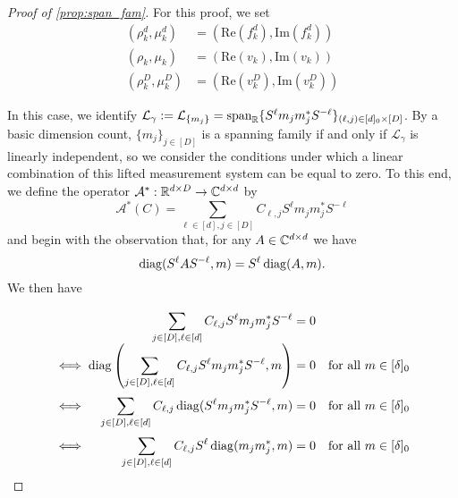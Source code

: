 \begin{proof}[Proof of \cref{prop:span_fam}]
  For this proof, we set \begin{align*} (\rho_k^d, \mu_k^d) &= (\mathrm{Re}(f_k^d), \mathrm{Im}(f_k^d)) \\ (\rho_k, \mu_k) &= (\mathrm{Re}(v_k), \mathrm{Im}(v_k)) \\ (\rho_k^D, \mu_k^D) &= (\mathrm{Re}(v_k^D), \mathrm{Im}(v_k^D)) \end{align*}
  
  In this case, we identify $\mathcal{L}_\gamma := \mathcal{L}_{\{m_j\}} = \operatorname{span}_{\mathbb{R}}\{S^{\ell} m_j m_j^* S^{-\ell}\}_{(\ell, j) \in [d]_0 \times [D]}$.  By a basic dimension count, $\{m_j\}_{j \in [D]}$ is a spanning family if and only if $\mathcal{L}_\gamma$ is linearly independent, so we consider the conditions under which a linear combination of this lifted measurement system can be equal to zero.  To this end, we define the operator $\mathcal{A}^* : \mathbb{R}^{d \times D} \to \mathbb{C}^{d \times d}$ by \begin{equation} \mathcal{A}^*(C) = \sum_{\ell \in [d], j \in [D]} C_{\ell, j} S^\ell m_j m_j^* S^{-\ell} \label{eq:synth_op} \end{equation} and begin with the observation that, for any $A \in \mathbb{C}^{d \times d}$ we have \[\operatorname{diag}(S^\ell A S^{-\ell}, m) = S^\ell \operatorname{diag}(A, m).\]  We then have
  \[\arraycolsep=1.4pt\def\arraystretch{2}
  \begin{array}{c>{\displaystyle}rcl@{\quad}r}
    & \sum_{j \in [D], \ell \in [d]} C_{\ell, j} S^\ell m_j m_j^* S^{-\ell} & = & 0 & \\
    \iff & \diag\left(\sum_{j \in [D], \ell \in [d]} C_{\ell, j} S^\ell m_j m_j^* S^{-\ell}, m\right) & = & 0 & \text{for all} \ m \in [\delta]_0 \\
    \iff & \sum_{j \in [D], \ell \in [d]} C_{\ell, j} \diag(S^\ell m_j m_j^* S^{-\ell}, m) & = & 0 & \text{for all} \ m \in [\delta]_0 \\
    \iff & \sum_{j \in [D], \ell \in [d]} C_{\ell, j} S^{\ell} \diag(m_j m_j^*, m) & = & 0 & \text{for all} \ m \in [\delta]_0 \\
  \end{array}\]
  

\end{proof}
